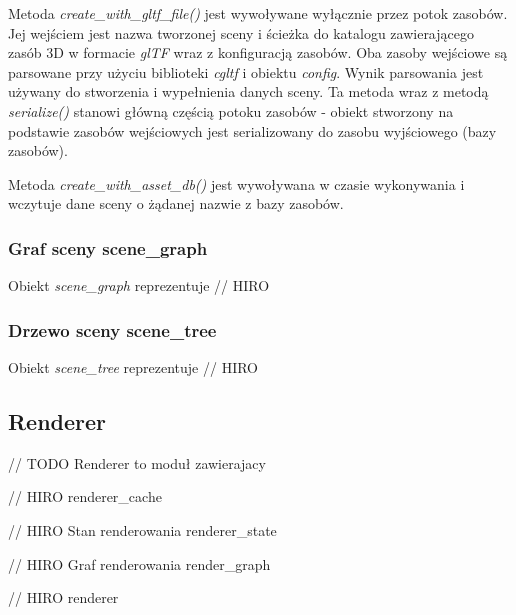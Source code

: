 Metoda \textit{create\_with\_gltf\_file()} jest wywoływane wyłącznie przez potok zasobów.
Jej wejściem jest nazwa tworzonej sceny i ścieżka do katalogu zawierającego zasób 3D w formacie \textit{glTF} wraz z konfiguracją zasobów.
Oba zasoby wejściowe są parsowane przy użyciu biblioteki \textit{cgltf} i obiektu \textit{config}.
Wynik parsowania jest używany do stworzenia i wypełnienia danych sceny.
Ta metoda wraz z metodą \textit{serialize()} stanowi główną częścią potoku zasobów - obiekt stworzony na podstawie zasobów wejściowych jest serializowany do zasobu wyjściowego (bazy zasobów).

Metoda \textit{create\_with\_asset\_db()} jest wywoływana w czasie wykonywania i wczytuje dane sceny o żądanej nazwie z bazy zasobów.

\subsubsection{Graf sceny scene\_graph}
Obiekt \textit{scene\_graph} reprezentuje
// HIRO

\subsubsection{Drzewo sceny scene\_tree}
Obiekt \textit{scene\_tree} reprezentuje
// HIRO

\subsection{Renderer}

// TODO Renderer to moduł zawierajacy 

// HIRO renderer\_cache

// HIRO Stan renderowania renderer\_state

// HIRO Graf renderowania render\_graph

// HIRO renderer